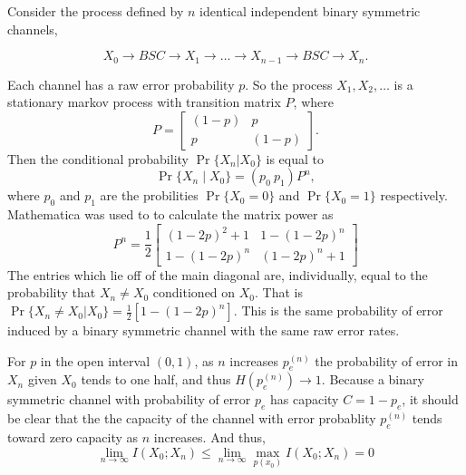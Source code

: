 \documentclass[12pt]{article}
\newcommand{\setbrace}[1]{{\{#1\}}}
\begin{document}
Consider the process defined by $n$ identical independent binary symmetric
channels,

\begin{equation*}
    X_0 \rightarrow \boxed{BSC} \rightarrow X_1 \rightarrow \dots
    \rightarrow X_{n-1} \rightarrow \boxed{BSC} \rightarrow X_n.
\end{equation*}

Each channel has a raw error probability $p$. So the process
$X_1,X_2,\dots$
is a stationary markov process with transition matrix $P$, where
\begin{equation*}
    P = \left[ \begin{array}{ccc}
        (1-p) & p \\
        p & (1-p)
    \end{array} \right].
\end{equation*}
Then the conditional probability $\Pr \setbrace{X_n|X_0}$ is equal to 
\begin{equation*}
    \Pr \setbrace{X_n \mid X_0} =  (p_0\ p_1)P^n,
\end{equation*}
where $p_0$ and $p_1$ are the probilities $\Pr \setbrace{X_0 = 0}$ and
$\Pr \setbrace{X_0 = 1}$ respectively. Mathematica was used to to
calculate the matrix power as
\begin{equation*}
    P^n = \frac{1}{2}\left[ \begin{array}{ccc}
        (1-2p)^2 + 1 & 1-(1-2p)^n \\
        1-(1-2p)^n & (1-2p)^n + 1
    \end{array}\right]
\end{equation*}
The entries which lie off of the main diagonal are, individually, equal to
the probability that $X_n \neq X_0$ conditioned on $ X_0$. That is
$\Pr \{X_n \neq X_0 | X_0\} = \frac{1}{2}[1-(1-2p)^n]$. This is the same
probability of error induced by a binary symmetric channel with the same
raw error rates.

For $p$ in the open interval $(0,1)$, as $n$ increases $p_e^{(n)}$ the probability of
error in $X_n$ given $X_0$ tends to one half, and thus $H(p_e^{(n)}) \rightarrow 1$.
Because a binary symmetric channel with probability of error $p_e$ has
capacity $C = 1-p_e$, it should be clear that the the capacity of the
channel with error probablity $p_e^{(n)}$ tends toward zero capacity as
$n$ increases. And thus,
\begin{equation*}
    \lim_{n \to \infty} I(X_0;X_n) \leq \lim_{n \to \infty} \max_{p(x_0)}
    I(X_0;X_n) = 0
\end{equation*}
\end{document}
